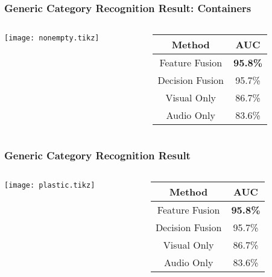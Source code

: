 \documentclass{beamer}
\begin{document}
  \begin{frame}
    \frametitle{Generic Category Recognition Result: Containers}
    
    \begin{columns}
      \begin{column}{.6\textwidth}
        \centering
        \footnotesize
        \texttt{[image: nonempty.tikz]}
      \end{column}
      \begin{column}{.4\textwidth}
        \footnotesize
        \begin{tabular}[h]{c|c}
          \hline
          Method & AUC \\ \hline \hline
          Feature Fusion & \textbf{95.8\%} \\ \hline
          Decision Fusion  & 95.7\% \\ \hline
          Visual Only & 86.7\% \\ \hline
          Audio Only & 83.6\% \\ \hline
        \end{tabular}
      \end{column}
    \end{columns}
  \end{frame}

  \begin{frame}
    \frametitle{Generic Category Recognition Result}
    
    \begin{columns}
      \begin{column}{.6\textwidth}
        \centering
        \footnotesize
        \texttt{[image: plastic.tikz]}
      \end{column}
      \begin{column}{.4\textwidth}
        \footnotesize
        \begin{tabular}[h]{c|c}
          \hline
          Method & AUC \\ \hline \hline
          Feature Fusion & \textbf{95.8\%} \\ \hline
          Decision Fusion  & 95.7\% \\ \hline
          Visual Only & 86.7\% \\ \hline
          Audio Only & 83.6\% \\ \hline
        \end{tabular}
      \end{column}
    \end{columns}
  \end{frame}
\end{document}
